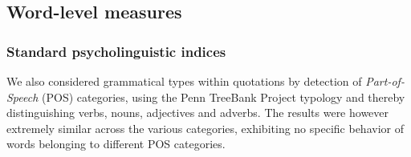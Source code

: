 
\subsection{Word-level measures}

\subsubsection{Standard psycholinguistic indices}


We also considered grammatical types within quotations by detection of \emph{Part-of-Speech} (POS) categories, using the Penn TreeBank Project typology \citep{Santorini90} and thereby distinguishing verbs, nouns, adjectives and 
adverbs.  The results were however extremely similar across the various categories, exhibiting no specific behavior of words belonging to different POS categories. %


